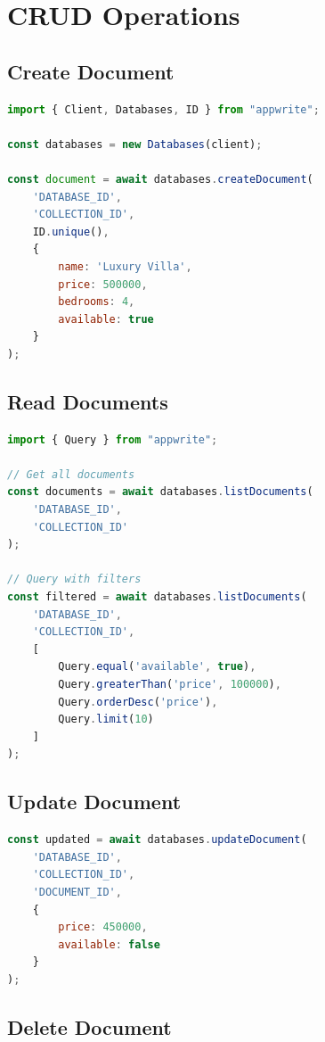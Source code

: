 \documentclass[11pt,a4paper,oneside]{book}
\begin{document}
\section{CRUD Operations}

\subsection{Create Document}

\begin{lstlisting}[language=JavaScript, caption=Creating a Document]
import { Client, Databases, ID } from "appwrite";

const databases = new Databases(client);

const document = await databases.createDocument(
    'DATABASE_ID',
    'COLLECTION_ID',
    ID.unique(),
    {
        name: 'Luxury Villa',
        price: 500000,
        bedrooms: 4,
        available: true
    }
);
\end{lstlisting}

\subsection{Read Documents}

\begin{lstlisting}[language=JavaScript, caption=Querying Documents]
import { Query } from "appwrite";

// Get all documents
const documents = await databases.listDocuments(
    'DATABASE_ID',
    'COLLECTION_ID'
);

// Query with filters
const filtered = await databases.listDocuments(
    'DATABASE_ID',
    'COLLECTION_ID',
    [
        Query.equal('available', true),
        Query.greaterThan('price', 100000),
        Query.orderDesc('price'),
        Query.limit(10)
    ]
);
\end{lstlisting}

\subsection{Update Document}

\begin{lstlisting}[language=JavaScript, caption=Updating a Document]
const updated = await databases.updateDocument(
    'DATABASE_ID',
    'COLLECTION_ID',
    'DOCUMENT_ID',
    {
        price: 450000,
        available: false
    }
);
\end{lstlisting}

\subsection{Delete Document}
\end{document}
